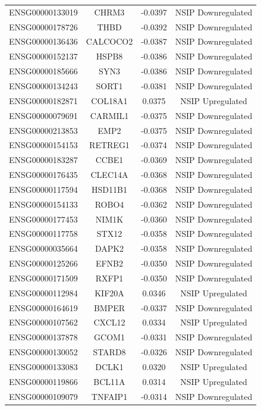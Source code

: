 \documentclass[
]{article}
\begin{document}
\begin{singlespace}
\begin{longtable}[t]{lccc}
ENSG00000133019 & CHRM3 & -0.0397 & NSIP Downregulated\\
ENSG00000178726 & THBD & -0.0392 & NSIP Downregulated\\
ENSG00000136436 & CALCOCO2 & -0.0387 & NSIP Downregulated\\
ENSG00000152137 & HSPB8 & -0.0386 & NSIP Downregulated\\
\addlinespace
ENSG00000185666 & SYN3 & -0.0386 & NSIP Downregulated\\
ENSG00000134243 & SORT1 & -0.0381 & NSIP Downregulated\\
ENSG00000182871 & COL18A1 & 0.0375 & NSIP Upregulated\\
ENSG00000079691 & CARMIL1 & -0.0375 & NSIP Downregulated\\
ENSG00000213853 & EMP2 & -0.0375 & NSIP Downregulated\\
\addlinespace
ENSG00000154153 & RETREG1 & -0.0374 & NSIP Downregulated\\
ENSG00000183287 & CCBE1 & -0.0369 & NSIP Downregulated\\
ENSG00000176435 & CLEC14A & -0.0368 & NSIP Downregulated\\
ENSG00000117594 & HSD11B1 & -0.0368 & NSIP Downregulated\\
ENSG00000154133 & ROBO4 & -0.0362 & NSIP Downregulated\\
\addlinespace
ENSG00000177453 & NIM1K & -0.0360 & NSIP Downregulated\\
ENSG00000117758 & STX12 & -0.0358 & NSIP Downregulated\\
ENSG00000035664 & DAPK2 & -0.0358 & NSIP Downregulated\\
ENSG00000125266 & EFNB2 & -0.0350 & NSIP Downregulated\\
ENSG00000171509 & RXFP1 & -0.0350 & NSIP Downregulated\\
\addlinespace
ENSG00000112984 & KIF20A & 0.0346 & NSIP Upregulated\\
ENSG00000164619 & BMPER & -0.0337 & NSIP Downregulated\\
ENSG00000107562 & CXCL12 & 0.0334 & NSIP Upregulated\\
ENSG00000137878 & GCOM1 & -0.0331 & NSIP Downregulated\\
ENSG00000130052 & STARD8 & -0.0326 & NSIP Downregulated\\
\addlinespace
ENSG00000133083 & DCLK1 & 0.0320 & NSIP Upregulated\\
ENSG00000119866 & BCL11A & 0.0314 & NSIP Upregulated\\
ENSG00000109079 & TNFAIP1 & -0.0314 & NSIP Downregulated\\

\end{longtable}
\end{singlespace}
\end{document}
